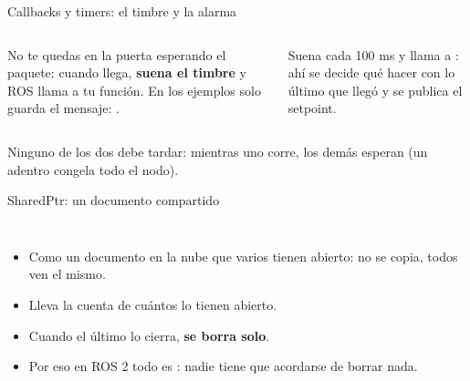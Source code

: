 \documentclass[aspectratio=169,10pt]{beamer}
\begin{document}
\begin{frame}{Callbacks y timers: el timbre y la alarma}
  \begin{columns}[t]
    \begin{idea}[title={\small\bfseries Callback = el timbre},coltitle=black,colbacktitle=azulclaro]
      \small No te quedas en la puerta esperando el paquete: cuando llega, \textbf{suena el timbre} y ROS
      llama a tu función. En los ejemplos solo guarda el mensaje: .
    \end{idea}
    \begin{idea}[title={\small\bfseries Timer = la alarma},coltitle=black,colbacktitle=azulclaro]
      \small Suena cada 100 ms y llama a : ahí se decide qué hacer con lo último que llegó y se
      publica el setpoint.
    \end{idea}
  \end{columns}
  \vspace{0.5em}
  \small Ninguno de los dos debe tardar: mientras uno corre, los demás esperan (un  adentro congela
  todo el nodo).
\end{frame}

\begin{frame}{SharedPtr: un documento compartido}
  \begin{columns}[c]
    \centering
    \small
    \begin{itemize}
      \item Como un documento en la nube que varios tienen abierto: no se copia, todos ven el mismo.
      \item Lleva la cuenta de cuántos lo tienen abierto.
      \item Cuando el último lo cierra, \textbf{se borra solo}.
      \item Por eso en ROS 2 todo es : nadie tiene que acordarse de borrar nada.
    \end{itemize}
  \end{columns}
\end{frame}
\end{document}

